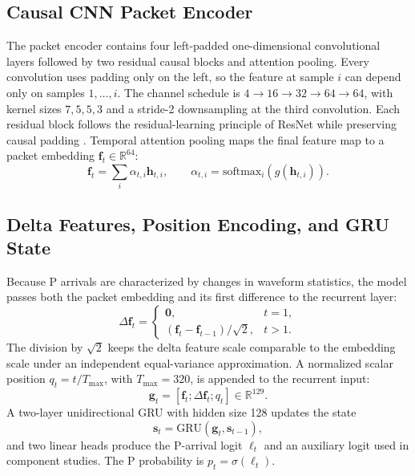 \documentclass[journal]{IEEEtran}
\begin{document}
\subsection{Causal CNN Packet Encoder}
The packet encoder contains four left-padded one-dimensional convolutional layers followed by two residual causal blocks and attention pooling. Every convolution uses padding only on the left, so the feature at sample $i$ can depend only on samples $1,\ldots,i$. The channel schedule is $4\rightarrow16\rightarrow32\rightarrow64\rightarrow64$, with kernel sizes $7,5,5,3$ and a stride-2 downsampling at the third convolution. Each residual block follows the residual-learning principle of ResNet while preserving causal padding \cite{he2016resnet}. Temporal attention pooling maps the final feature map to a packet embedding $\mathbf{f}_t\in\mathbb{R}^{64}$:
\begin{equation}
  \mathbf{f}_t = \sum_i \alpha_{t,i}\mathbf{h}_{t,i},\qquad
  \alpha_{t,i} = \mathrm{softmax}_i(g(\mathbf{h}_{t,i})).
\end{equation}

\subsection{Delta Features, Position Encoding, and GRU State}
Because P arrivals are characterized by changes in waveform statistics, the model passes both the packet embedding and its first difference to the recurrent layer:
\begin{equation}
  \Delta \mathbf{f}_t =
  \begin{cases}
    \mathbf{0}, & t=1,\\
    (\mathbf{f}_t-\mathbf{f}_{t-1})/\sqrt{2}, & t>1.
  \end{cases}
\end{equation}
The division by $\sqrt{2}$ keeps the delta feature scale comparable to the embedding scale under an independent equal-variance approximation. A normalized scalar position $q_t=t/T_{\max}$, with $T_{\max}=320$, is appended to the recurrent input:
\begin{equation}
  \mathbf{g}_t = [\mathbf{f}_t;\Delta\mathbf{f}_t;q_t]\in\mathbb{R}^{129}.
\end{equation}
A two-layer unidirectional GRU with hidden size 128 updates the state \cite{cho2014gru}
\begin{equation}
  \mathbf{s}_t = \mathrm{GRU}(\mathbf{g}_t,\mathbf{s}_{t-1}),
\end{equation}
and two linear heads produce the P-arrival logit $\ell_t$ and an auxiliary logit used in component studies. The P probability is $p_t=\sigma(\ell_t)$.
\end{document}

